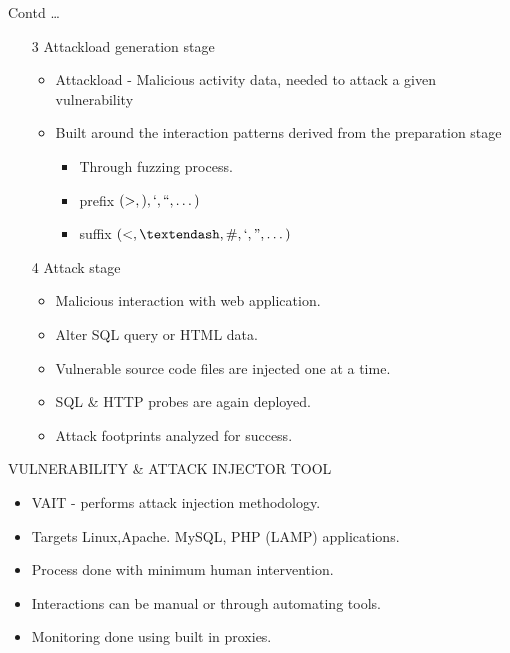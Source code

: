 \documentclass[xcolor=x11names,compress]{beamer}
\renewcommand{\(}{\begin{columns}}
\renewcommand{\)}{\end{columns}}
\newcommand{\<}[1]{\begin{column}{#1}}
\renewcommand{\>}{\end{column}}
\begin{document}
\begin{frame}{Contd \dots}
	\begin{enumerate}
			\item [3] Attackload generation stage
			\begin{itemize}
				\item Attackload - Malicious activity data, needed to attack a given vulnerability
				\item Built around the interaction patterns derived from the preparation stage
				\begin{itemize}
					\item Through fuzzing process. 
					\item prefix $ (>,),`,``, \dots) $
					\item suffix $ (<,–,\#,`,",\dots) $
				\end{itemize}
			
			\end{itemize}
			\item [4] Attack stage
			\begin{itemize}
				\item  Malicious interaction with web application.
				\item Alter SQL query or HTML data.
				\item Vulnerable source code files are injected one at a time.
				\item SQL \& HTTP probes are again deployed.
				\item Attack footprints analyzed for success.
			\end{itemize}
	\end{enumerate}
\end{frame}
\begin{frame}{VULNERABILITY \& ATTACK INJECTOR
		TOOL}
	\begin{itemize}
		\item VAIT - performs attack injection methodology.\newline
		\item Targets Linux,Apache. MySQL, PHP (LAMP) applications.\newline
		\item Process done with minimum human intervention.\newline
		\item Interactions can be manual or through automating tools.\newline
		\item Monitoring done using built in proxies. 
	\end{itemize}
\end{frame}
\end{document}
